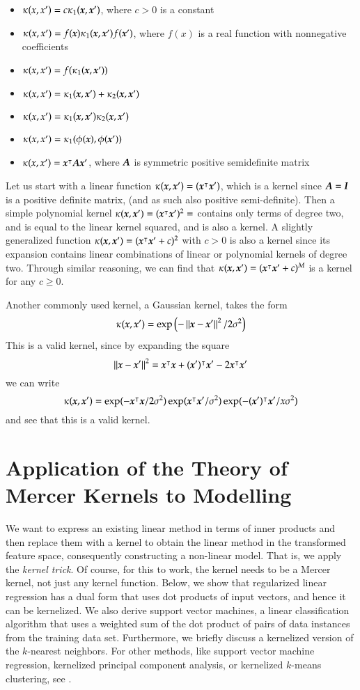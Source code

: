 \begin{refsection}
\begin{itemize}
    \item $\kappa(x, x') = c\kappa_1(\boldsymbol{x},\boldsymbol{x}')$, where $c>0$ is a constant
    \item $\kappa(x, x') = f(\boldsymbol{x})\kappa_1(\boldsymbol{x}, \boldsymbol{x}')f(\boldsymbol{x}')$, where $f(x)$ is a real function with nonnegative coefficients
    \item $\kappa(x, x') = f(\kappa_1(\boldsymbol{x}, \boldsymbol{x}'))$
    \item $\kappa(x, x') = \kappa_1(\boldsymbol{x}, \boldsymbol{x}') + \kappa_2(\boldsymbol{x},\boldsymbol{x}')$
    \item $\kappa(x, x') = \kappa_1(\boldsymbol{x}, \boldsymbol{x}')\kappa_2(\boldsymbol{x},\boldsymbol{x}')$
    \item $\kappa(x, x') = \kappa_1(\phi(\boldsymbol{x}),\phi(\boldsymbol{x}'))$
    \item $\kappa(x, x') = \boldsymbol{x}^\intercal \boldsymbol{A}\boldsymbol{x}'$, where $\boldsymbol{A}$ is symmetric positive semidefinite matrix
\end{itemize}

Let us start with a linear function $\kappa(\boldsymbol{x},\boldsymbol{x}')=(\boldsymbol{x}^\intercal \boldsymbol{x}')$, which is a kernel since $\boldsymbol{A}=\boldsymbol{I}$ is a positive definite matrix, (and as such also positive semi-definite). Then a simple polynomial kernel $\kappa(\boldsymbol{x},\boldsymbol{x}')=(\boldsymbol{x}^\intercal \boldsymbol{x}')^2=$ contains only terms of degree two, and is equal to the linear kernel squared, and is also a kernel. A slightly generalized function $\kappa(\boldsymbol{x},\boldsymbol{x}')=(\boldsymbol{x}^\intercal \boldsymbol{x}'+c)^2$ with $c>0$ is also a kernel since its expansion contains linear combinations of linear or polynomial kernels of degree two. Through similar reasoning, we can find that $\kappa(\boldsymbol{x},\boldsymbol{x}')=(\boldsymbol{x}^\intercal \boldsymbol{x}'+c)^M$ is a kernel for any $c\geq 0$.

Another commonly used kernel, a Gaussian kernel, takes the form
$$ \kappa(\boldsymbol{x}, \boldsymbol{x}')=\exp\left(-\left\lVert\boldsymbol{x}-\boldsymbol{x}'\right\rVert^2/2\sigma^2 \right) $$
This is a valid kernel, since by expanding the square
$$ \left\lVert\boldsymbol{x}-\boldsymbol{x}'\right\rVert^2=\boldsymbol{x}^\intercal\boldsymbol{x} + (\boldsymbol{x}')^\intercal\boldsymbol{x}' - 2\boldsymbol{x}^\intercal \boldsymbol{x}' $$
we can write
$$ \kappa(\boldsymbol{x}, \boldsymbol{x}')=\exp(-\boldsymbol{x}^\intercal\boldsymbol{x}/2\sigma^2) \exp(\boldsymbol{x}^\intercal\boldsymbol{x}'/\sigma^2) \exp(-(\boldsymbol{x}')^\intercal\boldsymbol{x}'/ x\sigma^2) $$
and see that this is a valid kernel.

\section{Application of the Theory of Mercer Kernels to Modelling}

We want to express an existing linear method in terms of inner products and then replace them with a kernel to obtain the linear method in the transformed feature space, consequently constructing a non-linear model. That is, we apply the \emph{kernel trick}. Of course, for this to work, the kernel needs to be a Mercer kernel, not just any kernel function. Below, we show that regularized linear regression has a dual form that uses dot products of input vectors, and hence it can be kernelized. We also derive support vector machines, a linear classification algorithm that uses a weighted sum of the dot product of pairs of data instances from the training data set. Furthermore, we briefly discuss a kernelized version of the $k$-nearest neighbors. For other methods, like support vector machine regression, kernelized principal component analysis, or kernelized $k$-means clustering, see \citep{2012-Murphy}.


\end{refsection}
